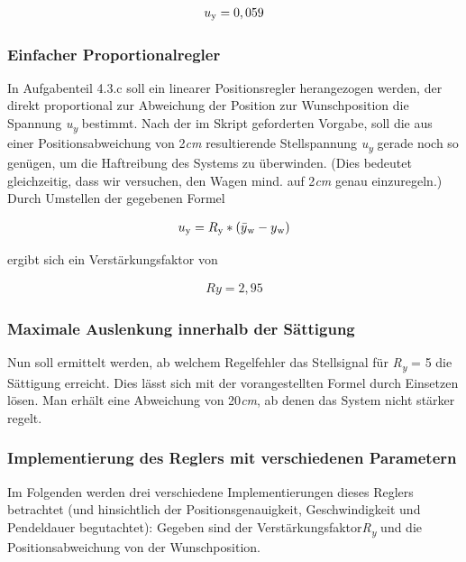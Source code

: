 \documentclass[10pt]{scrartcl}
\begin{document}
\begin {align}
 u\textsubscript{y} = 0,059 
\end{align}


\subsubsection {Einfacher Proportionalregler}
In Aufgabenteil 4.3.c soll ein linearer Positionsregler herangezogen werden, der direkt proportional zur Abweichung der Position zur Wunschposition die Spannung \textit{ u\textsubscript{y}} bestimmt.
Nach der im Skript geforderten Vorgabe, soll die aus einer Positionsabweichung von 2\textit{cm} resultierende Stellspannung \textit{ u\textsubscript{y}} gerade noch so genügen, um die Haftreibung des Systems zu überwinden. (Dies bedeutet gleichzeitig, dass wir versuchen, den Wagen mind. auf 2\textit{cm} genau einzuregeln.) 
Durch Umstellen der gegebenen Formel 

\begin {align}
u\textsubscript{y}=R\textsubscript{y}*(\bar{y}\textsubscript{w}-y\textsubscript{w}) 
\end{align}

ergibt sich ein Verstärkungsfaktor von 

\begin {align}
Ry=2,95
\end{align}


\subsubsection {Maximale Auslenkung innerhalb der Sättigung}

Nun soll ermittelt werden, ab welchem Regelfehler das Stellsignal für 
\textit{R\textsubscript{y}} = 5 die Sättigung erreicht. 
Dies lässt sich mit der vorangestellten Formel durch Einsetzen lösen. 
Man erhält eine Abweichung von 20\textit{cm}, ab denen das System nicht stärker regelt.


\subsubsection {Implementierung des Reglers mit verschiedenen Parametern}

Im Folgenden werden drei verschiedene Implementierungen dieses Reglers betrachtet (und hinsichtlich der Positionsgenauigkeit, Geschwindigkeit und Pendeldauer begutachtet):\newline
Gegeben sind der Verstärkungsfaktor\textit{R\textsubscript{y}} und die Positionsabweichung von der Wunschposition.
\end{document}
